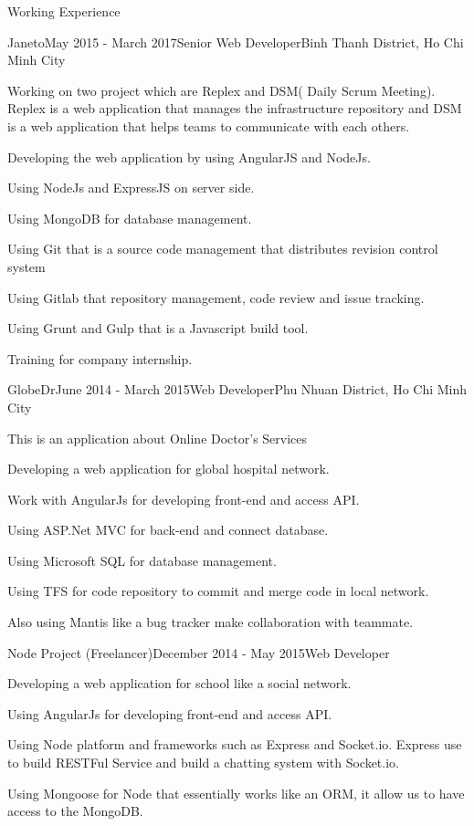 \documentclass{resume} %
\begin{document}
\begin{rSection}{Working Experience}
\begin{rSubsection}{Janeto}{May 2015 - March 2017}{Senior Web Developer}{Binh Thanh District, Ho Chi Minh City}
\item Working on two project which are Replex and DSM( Daily Scrum Meeting). Replex is a web application that manages the infrastructure repository and DSM is a web application that helps teams to communicate with each others. 
\item Developing the web application by using AngularJS and NodeJs.
\item Using NodeJs and ExpressJS on server side.
\item Using MongoDB for database management.
\item Using Git that is a source code management that distributes revision control system
\item Using Gitlab that repository management, code review and issue tracking.
\item Using Grunt and Gulp that is a Javascript build tool.
\item Training for company internship.
\end{rSubsection}


\begin{rSubsection}{GlobeDr}{June 2014 - March 2015}{Web Developer}{Phu Nhuan District, Ho Chi Minh City}
\item This is an application about Online Doctor's Services
\item Developing a web application for global hospital network.
\item Work with AngularJs for developing front-end and access API.
\item Using ASP.Net MVC for back-end and connect database.
\item Using Microsoft SQL for database management.
\item Using TFS for code repository to commit and merge code in local network.
\item Also using Mantis like a bug tracker make collaboration with teammate.
\end{rSubsection}


\begin{rSubsection}{Node Project (Freelancer)}{December 2014 - May 2015}{Web Developer}{}
\item Developing a web application for school like a social network.
\item Using AngularJs for developing front-end and access API.
\item Using Node platform and frameworks such as Express and Socket.io. Express use to build RESTFul Service and build a chatting system with Socket.io.
\item Using Mongoose for Node that essentially works like an ORM, it allow us to have access to the MongoDB.
\end{rSubsection}


\end{rSection}
\end{document}
